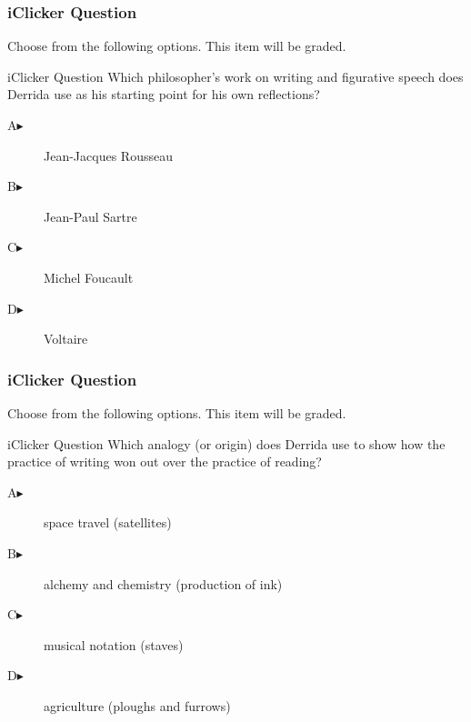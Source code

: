 \documentclass[xcolor=dvipsnames]{beamer}
\begin{document}
\begin{frame}
  \frametitle{iClicker Question}
Choose from the following options. This item will be graded.
\begin{block}{iClicker Question}
Which philosopher's work on writing and figurative speech does Derrida
use as his starting point for his own reflections?
\end{block}
\begin{description}
\item[A\hspace{.2in}$\blacktriangleright$] Jean-Jacques Rousseau
\item[B\hspace{.2in}$\blacktriangleright$] Jean-Paul Sartre
\item[C\hspace{.2in}$\blacktriangleright$] Michel Foucault
\item[D\hspace{.2in}$\blacktriangleright$] Voltaire
\end{description}
\end{frame}

\begin{frame}
  \frametitle{iClicker Question}
Choose from the following options. This item will be graded.
\begin{block}{iClicker Question}
Which analogy (or origin) does Derrida use to show how the practice of
writing won out over the practice of reading?
\end{block}
\begin{description}
\item[A\hspace{.2in}$\blacktriangleright$] space travel (satellites)
\item[B\hspace{.2in}$\blacktriangleright$] alchemy and chemistry (production of ink)
\item[C\hspace{.2in}$\blacktriangleright$] musical notation (staves)
\item[D\hspace{.2in}$\blacktriangleright$] agriculture (ploughs and furrows)
\end{description}
\end{frame}
\end{document}
